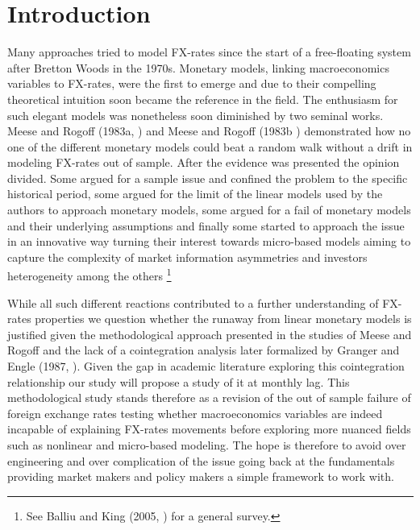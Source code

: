 \section{Introduction}

%
%
Many approaches tried to model FX-rates since the start of a free-floating system after Bretton Woods in the 1970s. Monetary models, linking macroeconomics variables to FX-rates, were the first to emerge and due to their compelling theoretical intuition soon became the reference in the field. The enthusiasm for such elegant models was nonetheless soon diminished by two seminal works. Meese and Rogoff (1983a, \cite{MeeseRogoffa}) and Meese and Rogoff (1983b \cite{MeeseRogoffb}) demonstrated how no one of the different monetary models could beat a random walk without a drift in modeling FX-rates out of sample. After the evidence was presented the opinion divided. Some argued for a sample issue and confined the problem to the specific historical period, some argued for the limit of the linear models used by the authors to approach monetary models, some argued for a fail of monetary models and their underlying assumptions and finally some started to approach the issue in an innovative way turning their interest towards micro-based models aiming to capture the complexity of market information asymmetries and investors heterogeneity among the others \footnote{See Balliu and King (2005, \cite{BalliuKing}) for a general survey.}

While all such different reactions contributed to a further understanding of FX-rates properties we question whether the runaway from linear monetary models is justified given the methodological approach presented in the studies of Meese and Rogoff and the lack of a cointegration analysis later formalized by Granger and Engle (1987,  \cite{EngleGranger}). Given the gap in academic literature exploring this cointegration relationship our study will propose a study of it at monthly lag.  %
% 
%
This methodological study stands therefore as a revision of the out of sample failure of foreign exchange rates testing whether macroeconomics variables are indeed incapable of explaining FX-rates movements before exploring more nuanced fields such as nonlinear and micro-based modeling. The hope is therefore to avoid over engineering and over complication of the issue going back at the fundamentals providing market makers and policy makers a simple framework to work with.

